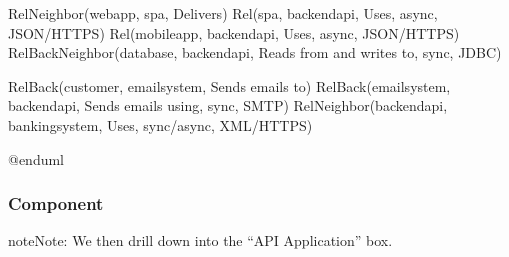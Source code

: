 \documentclass[letterpaper,10pt,english]{sphinxmanual}
\begin{document}
\begin{sphinxVerbatim}[commandchars=\\\{\},numbers=left,firstnumber=1,stepnumber=1]
Rel\PYGZus{}Neighbor(web\PYGZus{}app, spa, \PYGZdq{}Delivers\PYGZdq{})
Rel(spa, backend\PYGZus{}api, \PYGZdq{}Uses\PYGZdq{}, \PYGZdq{}async, JSON/HTTPS\PYGZdq{})
Rel(mobile\PYGZus{}app, backend\PYGZus{}api, \PYGZdq{}Uses\PYGZdq{}, \PYGZdq{}async, JSON/HTTPS\PYGZdq{})
Rel\PYGZus{}Back\PYGZus{}Neighbor(database, backend\PYGZus{}api, \PYGZdq{}Reads from and writes to\PYGZdq{}, \PYGZdq{}sync, JDBC\PYGZdq{})

Rel\PYGZus{}Back(customer, email\PYGZus{}system, \PYGZdq{}Sends e\PYGZhy{}mails to\PYGZdq{})
Rel\PYGZus{}Back(email\PYGZus{}system, backend\PYGZus{}api, \PYGZdq{}Sends e\PYGZhy{}mails using\PYGZdq{}, \PYGZdq{}sync, SMTP\PYGZdq{})
Rel\PYGZus{}Neighbor(backend\PYGZus{}api, banking\PYGZus{}system, \PYGZdq{}Uses\PYGZdq{}, \PYGZdq{}sync/async, XML/HTTPS\PYGZdq{})


@enduml

\end{sphinxVerbatim}


\subsubsection{Component}
\label{\detokenize{C4/C4Stdlib:component}}
\begin{sphinxadmonition}{note}{Note:}
We then drill down into the “API Application” box.
\end{sphinxadmonition}

\begin{figure}[htbp]
\centering

\end{figure}
\end{document}
